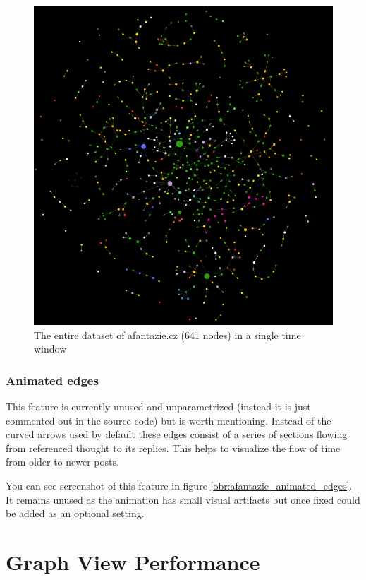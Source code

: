 \begin{figure}[p]
    \includegraphics[width=130mm, keepaspectratio]{img/afantzazie_production_dataset_641_nodes.png}
    \caption{The entire dataset of afantazie.cz (641 nodes) in a single time window}
    \label{obr:afantzazie_production_dataset_640_nodes}
\end{figure}

\subsubsection{Animated edges}
This feature is currently unused and unparametrized (instead it is just commented out in the source code) but is worth mentioning.
Instead of the curved arrows used by default these edges consist of a series of sections flowing from referenced thought to its replies. This helps to visualize the flow of time from older to newer posts.

You can see screenshot of this feature in figure \ref{obr:afantazie_animated_edges}.
It remains unused as the animation has small visual artifacts but once fixed could be added as an optional setting.

\section{Graph View Performance}

